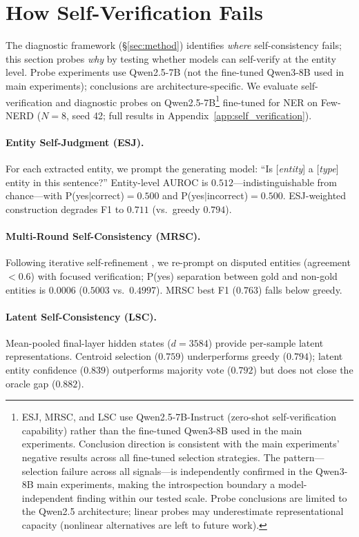 \section{How Self-Verification Fails}\label{sec:mechanistic}

The diagnostic framework (\S\ref{sec:method}) identifies \textit{where} self-consistency fails; this section probes \textit{why} by testing whether models can self-verify at the entity level.
Probe experiments use Qwen2.5-7B (not the fine-tuned Qwen3-8B used in main experiments); conclusions are architecture-specific.
We evaluate self-verification and diagnostic probes on Qwen2.5-7B\footnote{ESJ, MRSC, and LSC use Qwen2.5-7B-Instruct (zero-shot self-verification capability) rather than the fine-tuned Qwen3-8B used in the main experiments. Conclusion direction is consistent with the main experiments' negative results across all fine-tuned selection strategies. The pattern---selection failure across all signals---is independently confirmed in the Qwen3-8B main experiments, making the introspection boundary a model-independent finding within our tested scale. Probe conclusions are limited to the Qwen2.5 architecture; linear probes may underestimate representational capacity (nonlinear alternatives are left to future work).} fine-tuned for NER on Few-NERD ($N{=}8$, seed 42; full results in Appendix~\ref{app:self_verification}).

\paragraph{Entity Self-Judgment (ESJ).}
For each extracted entity, we prompt the generating model: ``Is [\textit{entity}] a [\textit{type}] entity in this sentence?''
Entity-level AUROC is $0.512$---indistinguishable from chance---with P(yes$|$correct)${=}0.500$ and P(yes$|$incorrect)${=}0.500$.
ESJ-weighted construction degrades F1 to $0.711$ (vs.\ greedy $0.794$).

\paragraph{Multi-Round Self-Consistency (MRSC).}
Following iterative self-refinement \cite{madaan2023selfrefine}, we re-prompt on disputed entities (agreement ${<}0.6$) with focused verification; P(yes) separation between gold and non-gold entities is $0.0006$ ($0.5003$ vs.\ $0.4997$).
MRSC best F1 ($0.763$) falls below greedy.

\paragraph{Latent Self-Consistency (LSC).}
Mean-pooled final-layer hidden states ($d{=}3584$) provide per-sample latent representations.
Centroid selection ($0.759$) underperforms greedy ($0.794$); latent entity confidence ($0.839$) outperforms majority vote ($0.792$) but does not close the oracle gap ($0.882$).

